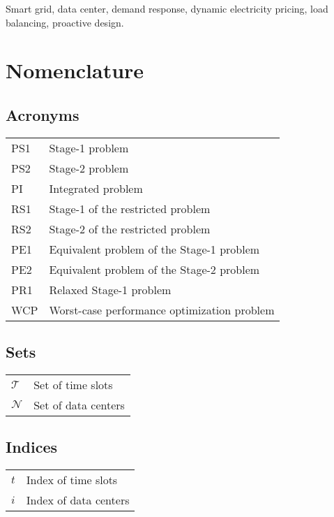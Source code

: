 \documentclass[journal]{IEEEtran}
\begin{document}
	\begin{IEEEkeywords}
		Smart grid, data center, demand response, dynamic electricity pricing, load balancing, proactive design.
	\end{IEEEkeywords}
	
\IEEEpeerreviewmaketitle

\section*{Nomenclature}

\subsection*{Acronyms}
\begin{tabular}{l l} PS1 &Stage-1 problem \\ 
	PS2 &Stage-2 problem \\
	PI &Integrated problem \\
	RS1 &Stage-1 of the restricted problem \\ 
	RS2 &Stage-2 of the restricted problem \\ 
	PE1 &Equivalent problem of the Stage-1 problem \\ 
	PE2 &Equivalent problem of the Stage-2 problem \\ 
	PR1 &Relaxed Stage-1 problem\\
	WCP &Worst-case performance optimization problem
\end{tabular}


\subsection*{Sets}
\begin{tabular}{l l} $\mathcal{T}$ &Set of time slots \\ 
	$\mathcal{N}$ &Set of data centers  
\end{tabular}


\subsection*{Indices}
\begin{tabular}{l l} $t$ &Index of time slots \\ 
	$i$ &Index of data centers
\end{tabular}
	
	
\end{document}
